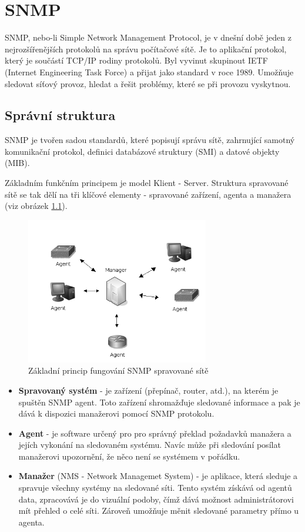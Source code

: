 \chapter{SNMP}
\label{kap_snmp}
SNMP, nebo-li Simple Network Management Protocol, je v dnešní době jeden z nejrozšířenějších protokolů na správu počítačové sítě. Je to aplikační protokol, který je součástí TCP/IP rodiny protokolů. 
Byl vyvinut skupinout IETF (Internet Engineering Task Force) a přijat jako standard v roce 1989. Umožňuje sledovat síťový provoz, hledat a řešit problémy, které se při provozu vyskytnou. 

\section{Správní struktura}
SNMP je tvořen sadou standardů, které popisují správu sítě, zahrnující samotný komunikační protokol, definici databázové struktury (SMI) a datové objekty (MIB).

Základním funkčním principem je model Klient - Server. Struktura spravované sítě se tak dělí na tři klíčové elementy - spravované zařízení, agenta a manažera (viz obrázek \ref{obr_snmp1}).

\begin{figure}[htp]
	\begin{center}
		\includegraphics[width=8cm]{obrazky/02_snmp_principle.png}
		\caption{Základní princip fungování SNMP spravované sítě}
		\label{obr_snmp1}
	\end{center}
\end{figure}

\begin{itemize}
	\item \textbf{Spravovaný systém} - je zařízení (přepínač, router, atd.), na kterém je spuštěn SNMP agent. Toto zařízení shromažďuje sledované informace a pak je
	dává k dispozici manažerovi pomocí SNMP protokolu.
	\item \textbf{Agent} - je software určený pro pro správný překlad požadavků manažera a jejích vykonání na sledovaném systému. Navíc může při sledování posílat manažerovi 
	upozornění, že něco není se systémem v pořádku.
	\item \textbf{Manažer} (NMS - Network Managemet System) - je aplikace, která sleduje a spravuje všechny systémy na sledované síti. Tento systém získává od agentů data, zpracovává je do vizuální podoby, 
	čímž dává možnost administrátorovi mít přehled o celé síti. Zároveň umožňuje měnit sledované parametry přímo u agenta.
\end{itemize}

